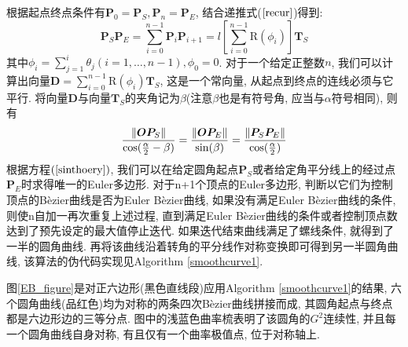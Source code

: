 \documentclass[utf8]{ctexart} %
\begin{document}
		根据起点终点条件有$\boldsymbol{P}_0=\boldsymbol{P}_S, \boldsymbol{P}_n = \boldsymbol{P}_E$, 结合递推式($\ref{recur}$)得到:
		\begin{equation}
			\boldsymbol{P}_S\boldsymbol{P}_E = \sum_{i=0}^{n-1}\boldsymbol{P}_i\boldsymbol{P}_{i+1} = l[\sum_{i=0}^{n-1}\text{R}(\phi_i)]\boldsymbol{T}_S
		\end{equation}
		其中$\phi_i=\sum_{j=1}^i\theta_j (i = 1,\dots,n-1), \phi_0 = 0$. 对于一个给定正整数$n$, 我们可以计算出向量$\boldsymbol{D} = \sum_{i=0}^{n-1}\text{R}(\phi_i)\boldsymbol{T}_S$, 这是一个常向量, 从起点到终点的连线必须与它平行. 将向量$\boldsymbol{D}$与向量$\boldsymbol{T}_S$的夹角记为$\beta$(注意$\beta$也是有符号角, 应当与$\alpha$符号相同), 则有
		\begin{equation}\label{sinthoery}
			\frac{\Arrowvert\boldsymbol{OP}_S\Arrowvert}{\cos(\frac{\alpha}2-\beta)}=\frac{\Arrowvert\boldsymbol{OP}_E\Arrowvert}{\sin(\beta)}=\frac{\Arrowvert\boldsymbol{P}_S\boldsymbol{P}_E\Arrowvert}{\cos(\frac{\alpha}2)}
		\end{equation}
		根据方程$(\ref{sinthoery})$, 我们可以在给定圆角起点$\boldsymbol{P}_S$或者给定角平分线上的经过点$\boldsymbol{P}_E$时求得唯一的Euler多边形. 对于n+1个顶点的Euler多边形, 判断以它们为控制顶点的B\`{e}zier曲线是否为Euler B\`{e}zier曲线, 如果没有满足Euler B\`{e}zier曲线的条件, 则使n自加一再次重复上述过程, 直到满足Euler B\`{e}zier曲线的条件或者控制顶点数达到了预先设定的最大值停止迭代. 如果迭代结束曲线满足了螺线条件, 就得到了一半的圆角曲线. 再将该曲线沿着转角的平分线作对称变换即可得到另一半圆角曲线, 该算法的伪代码实现见Algorithm \ref{smoothcurve1}.\par 
		图\ref{EB_figure}是对正六边形(黑色直线段)应用Algorithm \ref{smoothcurve1}的结果, 六个圆角曲线(品红色)均为对称的两条四次B\`ezier曲线拼接而成, 其圆角起点与终点都是六边形边的三等分点. 图中的浅蓝色曲率梳表明了该圆角的$G^2$连续性, 并且每一个圆角曲线自身对称, 有且仅有一个曲率极值点, 位于对称轴上.
		\IncMargin{1em}
\end{document}
